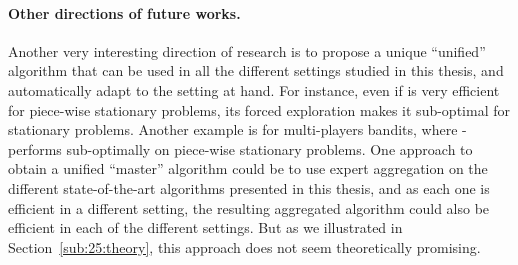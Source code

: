 

\paragraph{Other directions of future works.}

Another very interesting direction of research is to propose a unique ``unified'' algorithm that can be used in all the different settings studied in this thesis, and automatically adapt to the setting at hand.
For instance, even if \GLRklUCB{} is very efficient for piece-wise stationary problems, its forced exploration makes it sub-optimal for stationary problems.
Another example is for multi-players bandits, where \MCTopM-\klUCB{} performs sub-optimally on piece-wise stationary problems.
One approach to obtain a unified ``master'' algorithm could be to use expert aggregation on the different state-of-the-art algorithms presented in this thesis, and as each one is efficient in a different setting, the resulting aggregated algorithm could also be efficient in each of the different settings.
But as we illustrated in Section~\ref{sub:25:theory}, this approach does not seem theoretically promising.






